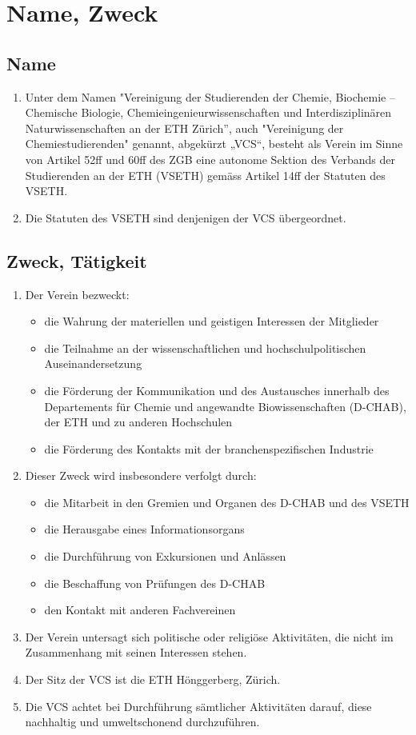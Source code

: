 \section{Name, Zweck}

\subsection{Name}
\begin{enumerate}
\item Unter dem Namen "Vereinigung der Studierenden der Chemie, Biochemie – Chemische Biologie, Chemieingenieurwissenschaften und Interdisziplinären Naturwissenschaften an der ETH Zürich”, auch "Vereinigung der Chemiestudierenden" genannt, abgekürzt „VCS“, besteht als Verein im Sinne von Artikel 52ff und 60ff des ZGB eine autonome Sektion des Verbands der Studierenden an der ETH (VSETH) gemäss Artikel 14ff der Statuten des VSETH.
 \item Die Statuten des VSETH sind denjenigen der VCS übergeordnet.
\end{enumerate}

\subsection{Zweck, Tätigkeit}
\begin{enumerate}
\item Der Verein bezweckt:
	\begin{itemize}
	\item die Wahrung der materiellen und geistigen Interessen der Mitglieder
	\item die Teilnahme an der wissenschaftlichen und hochschulpolitischen Auseinandersetzung
	\item die Förderung der Kommunikation und des Austausches innerhalb des Departements für Chemie und angewandte Biowissenschaften (D-CHAB), der ETH und zu anderen Hochschulen
	\item die Förderung des Kontakts mit der branchenspezifischen Industrie
	\end{itemize}
\item Dieser Zweck wird insbesondere verfolgt durch:
	\begin{itemize}
	\item die Mitarbeit in den Gremien und Organen des D-CHAB und des VSETH
	\item die Herausgabe eines Informationsorgans
	\item die Durchführung von Exkursionen und Anlässen
	\item die Beschaffung von Prüfungen des D-CHAB
	\item den Kontakt mit anderen Fachvereinen
	\end{itemize}
\item Der Verein untersagt sich politische oder religiöse Aktivitäten, die nicht im Zusammenhang mit seinen Interessen stehen.
\item Der Sitz der VCS ist die ETH Hönggerberg, Zürich.
\item Die VCS achtet bei Durchführung sämtlicher Aktivitäten darauf, diese nachhaltig und umweltschonend durchzuführen.
\end{enumerate}

